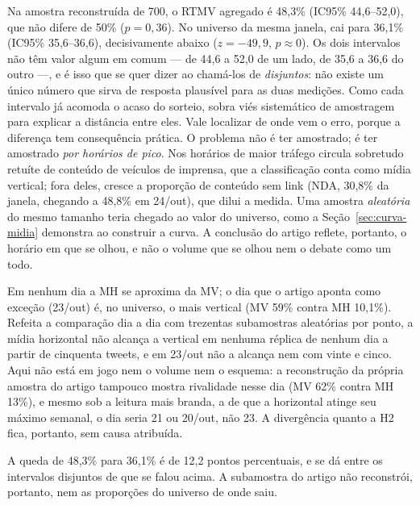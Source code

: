 \begin{description}[leftmargin=1.5em,style=nextline]
  \item[H1 (RTMV > 50\%) é artefato da amostragem por pico.] Na amostra
  reconstruída de 700, o RTMV agregado é 48,3\% (IC95\% 44,6--52,0), que não
  difere de 50\% ($p=0{,}36$). No universo da mesma janela, cai para
  36,1\% (IC95\% 35,6--36,6), decisivamente abaixo ($z=-49{,}9$,
  $p\approx0$). Os dois intervalos não têm valor algum em comum --- de 44,6 a 52,0 de
  um lado, de 35,6 a 36,6 do outro ---, e é isso que se quer dizer ao chamá-los de
  \emph{disjuntos}: não existe um único número que sirva de resposta plausível para as
  duas medições. Como cada intervalo já acomoda o acaso do sorteio, sobra viés
  sistemático de amostragem para explicar a distância entre eles. Vale localizar de onde vem o erro, porque a
  diferença tem consequência prática. O problema não é ter amostrado; é ter
  amostrado \emph{por horários de pico}. Nos horários de maior tráfego circula
  sobretudo retuíte de conteúdo de veículos de imprensa, que a classificação conta
  como mídia vertical; fora deles, cresce a proporção de conteúdo sem link (NDA,
  30,8\% da janela, chegando a 48,8\% em 24/out), que dilui a medida. Uma amostra
  \emph{aleatória} do mesmo tamanho teria chegado ao valor do universo, como a
  Seção~\ref{sec:curva-midia} demonstra ao construir a curva. A conclusão do artigo
  reflete, portanto, o horário em que se olhou, e não o volume que se olhou nem o
  debate como um todo.
  \item[H2 (MH rivaliza com MV) não reproduz.] Em nenhum dia a MH se
  aproxima da MV; o dia que o artigo aponta como exceção (23/out) é, no universo,
  o mais vertical (MV 59\% contra MH 10,1\%). Refeita a comparação dia a dia com
  trezentas subamostras aleatórias por ponto, a mídia horizontal não alcança a
  vertical em nenhuma réplica de nenhum dia a partir de cinquenta tweets, e em
  23/out não a alcança nem com vinte e cinco. Aqui não está em jogo nem o volume
  nem o esquema: a reconstrução da própria amostra do artigo tampouco
  mostra rivalidade nesse dia (MV 62\% contra MH 13\%), e mesmo sob a leitura mais
  branda, a de que a horizontal atinge seu máximo semanal, o dia seria 21 ou
  20/out, não 23. A divergência quanto a H2 fica, portanto, sem causa atribuída.
  \item[A amostra não representa o próprio universo.] A queda de 48,3\% para
  36,1\% é de 12,2 pontos percentuais, e se dá entre os intervalos disjuntos de que
  se falou acima. A subamostra do artigo não reconstrói, portanto, nem as
  proporções do universo de onde saiu.
\end{description}

